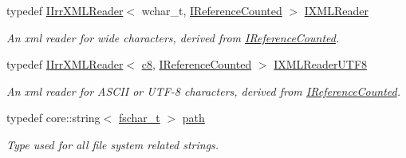 \begin{DoxyCompactItemize}
typedef \hyperlink{classirr_1_1io_1_1IIrrXMLReader}{I\+Irr\+X\+M\+L\+Reader}$<$ wchar\+\_\+t, \hyperlink{classirr_1_1IReferenceCounted}{I\+Reference\+Counted} $>$ \hyperlink{namespaceirr_1_1io_a9dc6291fb7e4c73155a3e3c8339f9bff}{I\+X\+M\+L\+Reader}
\begin{DoxyCompactList}\small\item\em An xml reader for wide characters, derived from \hyperlink{classirr_1_1IReferenceCounted}{I\+Reference\+Counted}. \end{DoxyCompactList}\item 
typedef \hyperlink{classirr_1_1io_1_1IIrrXMLReader}{I\+Irr\+X\+M\+L\+Reader}$<$ \hyperlink{namespaceirr_a9395eaea339bcb546b319e9c96bf7410}{c8}, \hyperlink{classirr_1_1IReferenceCounted}{I\+Reference\+Counted} $>$ \hyperlink{namespaceirr_1_1io_a2dedc8156931082e6b147b562195e310}{I\+X\+M\+L\+Reader\+U\+T\+F8}
\begin{DoxyCompactList}\small\item\em An xml reader for A\+S\+C\+II or U\+T\+F-\/8 characters, derived from \hyperlink{classirr_1_1IReferenceCounted}{I\+Reference\+Counted}. \end{DoxyCompactList}\item 
typedef core\+::string$<$ \hyperlink{namespaceirr_a813cca9bac9fa0c1427d89720a451460}{fschar\+\_\+t} $>$ \hyperlink{namespaceirr_1_1io_ab1bdc45edb3f94d8319c02bc0f840ee1}{path}
\begin{DoxyCompactList}\small\item\em Type used for all file system related strings. \end{DoxyCompactList}\end{DoxyCompactItemize}
